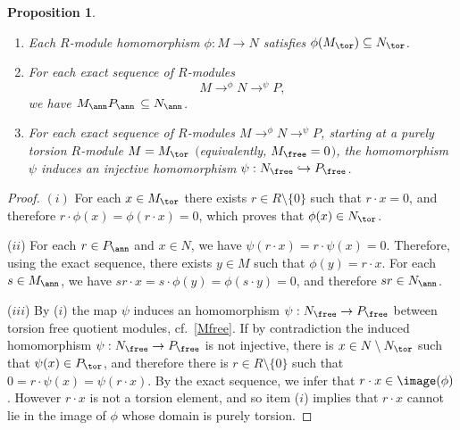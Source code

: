 \documentclass[11pt,a4paper,reqno]{article}
\DeclareMathOperator*{\toup}{\longrightarrow}
\numberwithin{equation}{section}
\newtheorem{proposition}[theorem]{Proposition}
\theoremstyle{definition}
\begin{document}
\begin{proposition}$ $
\label{p:modules} 
\begin{enumerate}[$(i)$]
\setlength{\itemsep}{5pt}
\item Each $R$-module homomorphism $\phi:M\to N$ satisfies $\phi(M_\tor)\subseteq N_\tor$.

\item For each exact sequence of $R$-modules
\[M\toup^{\phi}N\toup^{\psi}P,\] 
we have $ M_\ann P_\ann$ $\subseteq N_\ann $. 

\item For each exact sequence of $R$-modules
$\displaystyle M\toup^{\phi}N\toup^{\psi}P $, 
starting at a purely torsion $R$-module $M=M_\tor$ $($equivalently, $M_\free = 0 $$)$, the homomorphism $\psi$ induces an injective homomorphism 
$ \psi:N_\free\hookrightarrow P_\free $. 


\end{enumerate}
\end{proposition}

\begin{proof}
$ (i)$ For each $x\in M_\tor$ there exists $r\in R\setminus\{0\}$ such that $r\cdot x=0$, and therefore $r\cdot\phi(x)=\phi(r\cdot x)=0$, which proves that $\phi(x)\in N_\tor$.

($ii$) For each $r\in P_\ann$ and $x\in N$, we have $\psi(r\cdot x)=r\cdot\psi(x)=0$. Therefore, using the exact sequence, there exists $y\in M$ such that $\phi(y)=r\cdot x$. For each $s\in M_\ann$, we have $sr\cdot x=s\cdot\phi(y)=\phi(s\cdot y)=0$, and therefore $sr\in N_\ann$.

($iii$) By ($i$) the map
$ \psi $   induces an homomorphism $ \psi : N_\free \to  P_\free $ between  torsion free quotient modules, cf.~\eqref{Mfree}. If by contradiction the induced homomorphism $\psi:N_\free\to P_\free$ is not injective,  there is %
$x\in N\setminus N_\tor$ such that $\psi(x)\in P_\tor$, and therefore there is $r\in R\setminus\{0\}$ such that $0=r\cdot\psi(x)=\psi(r\cdot x)$. By the exact sequence, we infer that $r\cdot x\in\image(\phi)$. However $r\cdot x$ is not a torsion element, and so item ($i$) implies that  $r\cdot x$ cannot lie in the image of $\phi$ whose domain is purely torsion.
\end{proof}
\end{document}
